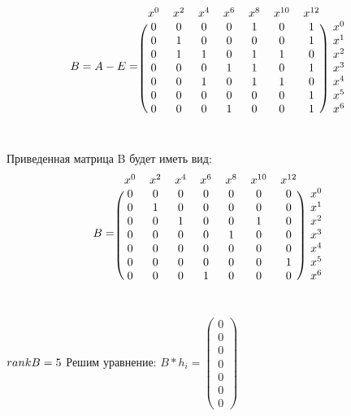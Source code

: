 \documentclass[12pt]{article}
\begin{document}
\[
B = A - E = 
\begin{blockarray}{cccccccc}
x^0 & x^2 & x^4 & x^6 & x^8 & x^{10} & x^{12}\\
\begin{block}{(ccccccc)c}
  0 & 0 & 0 & 0 & 1 & 0 & 1 & x^0\\
  0 & 1 & 0 & 0 & 0 & 0 & 1 & x^1\\
  0 & 1 & 1 & 0 & 1 & 1 & 0 & x^2\\
  0 & 0 & 0 & 1 & 1 & 0 & 1 & x^3\\
  0 & 0 & 1 & 0 & 1 & 1 & 0 & x^4\\
  0 & 0 & 0 & 0 & 0 & 0 & 1 & x^5\\
  0 & 0 & 0 & 1 & 0 & 0 & 1 & x^6\\
\end{block}
\end{blockarray}
 \]\\
 Приведенная матрица B будет иметь вид:\\
 \[
B = 
\begin{blockarray}{cccccccc}
x^0 & x^2 & x^4 & x^6 & x^8 & x^{10} & x^{12}\\
\begin{block}{(ccccccc)c}
  0 & 0 & 0 & 0 & 0 & 0 & 0 & x^0\\
  0 & 1 & 0 & 0 & 0 & 0 & 0 & x^1\\
  0 & 0 & 1 & 0 & 0 & 1 & 0 & x^2\\
  0 & 0 & 0 & 0 & 1 & 0 & 0 & x^3\\
  0 & 0 & 0 & 0 & 0 & 0 & 0 & x^4\\
  0 & 0 & 0 & 0 & 0 & 0 & 1 & x^5\\
  0 & 0 & 0 & 1 & 0 & 0 & 0 & x^6\\
\end{block}
\end{blockarray}
 \]\\
 $rank B = 5\\$
 Решим уравнение: $B * h_i= \begin{pmatrix}
                      0 \\
                      0 \\
                      0 \\
                      0 \\
                      0 \\
                      0 \\
                      0
                  \end{pmatrix}$\\\\
\end{document}
